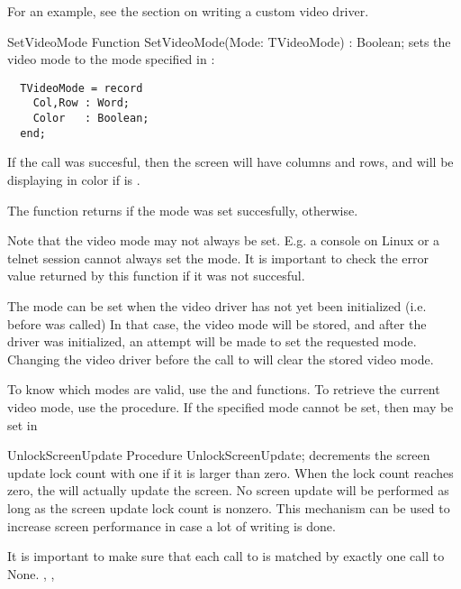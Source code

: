 For an example, see the section on writing a custom video driver.

\begin{function}{SetVideoMode}
\Declaration
Function SetVideoMode(Mode: TVideoMode) : Boolean;
\Description
{} sets the video mode to the mode specified in :
\begin{verbatim}
  TVideoMode = record
    Col,Row : Word;
    Color   : Boolean;
  end;
\end{verbatim}
If the call was succesful, then the screen will have  columns and
 rows, and will be displaying in color if  is
. 

The function returns  if the mode was set succesfully, 
otherwise.

Note that the video mode may not always be set. E.g. a console on Linux
or a telnet session cannot always set the mode. It is important to check
the error value returned by this function if it was not succesful.

The mode can be set when the video driver has not yet been initialized
(i.e. before  was called) In that case, the video mode will
be stored, and after the driver was initialized, an attempt will be made to
set the requested mode. Changing the video driver before the call to
 will clear the stored video mode.

To know which modes are valid, use the  and
 functions. To retrieve the current video mode, 
use the  procedure.
\Errors
If the specified mode cannot be set, then  may be set
in 
\SeeAlso
{}
\end{function}

\begin{procedure}{UnlockScreenUpdate}
\Declaration
Procedure UnlockScreenUpdate;
\Description
{} decrements the screen update lock count with one if
it is larger than zero. When the lock count reaches zero, the 
 will actually update the screen. No screen update will 
be performed as long as the screen update lock count is nonzero. This 
mechanism can be used to increase screen performance in case a lot of 
writing is done. 

It is important to make sure that each call to  is
matched by exactly one call to 
\Errors
None.
\SeeAlso
{}, , 
\end{procedure}

